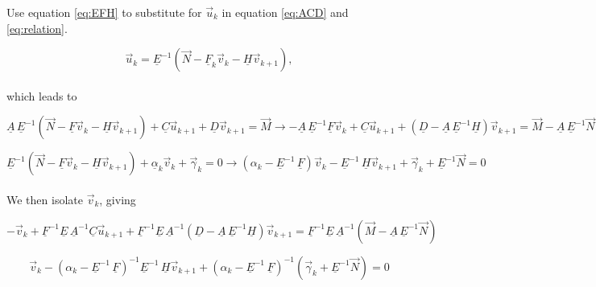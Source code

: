 \documentclass[11pt]{amsart}
\begin{document}
Use equation \ref{eq:EFH} to substitute for $\vec{u}_{k}$ in equation \ref{eq:ACD} and \ref{eq:relation}.

\begin{equation} \label{eq:IIIa}
\vec{u}_{k}  = \underline{E}^{-1}  \left( \vec{N} - \underline{F}_{k}  \vec{v}_{k}  - \underline{H} \vec{v}_{k+1} \right),
\end{equation}
\\
which leads to

\begin{equation} \label{eq:IIIb}
\underline{A} \, \underline{E}^{-1} \left(  \vec{N} - \underline{F} \vec{v}_{k} - \underline{H} \vec{v}_{k+1}  \right)  +  \underline{C} \vec{u}_{k+1}  +  \underline{D} \vec{v}_{k+1}  =  \vec{M}   \longrightarrow   - \underline{A} \, \underline{E}^{-1} \underline{F} \vec{v}_{k}  +  \underline{C} \vec{u}_{k+1}  +  \left( \underline{D} - \underline{A} \, \underline{E}^{-1} \underline{H} \right) \vec{v}_{k+1}  =  \vec{M}  -  \underline{A} \, \underline{E}^{-1} \vec{N}
\end{equation}

\begin{equation} \label{eq:IIIc}
\underline{E}^{-1} \left(  \vec{N} - \underline{F} \vec{v}_{k} - \underline{H} \vec{v}_{k+1}  \right)  +  \underline{\alpha}_{k} \vec{v}_{k}  +  \vec{\gamma}_{k}  =  0     \longrightarrow  \left(   \alpha_{k}  -  \underline{E}^{-1} \, \underline{F}  \right) \vec{v}_{k}  -  \underline{E}^{-1} \, \underline{H} \vec{v}_{k+1}  +  \vec{\gamma}_{k}  +  \underline{E}^{-1} \vec{N}  =  0
\end{equation} 
\\

We then isolate $\vec{v}_{k}$, giving

\begin{equation} \label{eq:IIId}
-  \vec{v}_{k}  +  \underline{F}^{-1} \underline{E} \, \underline{A}^{-1} \underline{C} \vec{u}_{k+1}  +  \underline{F}^{-1} \underline{E} \, \underline{A}^{-1} \left( \underline{D} - \underline{A} \, \underline{E}^{-1} \underline{H} \right) \vec{v}_{k+1}  =  \underline{F}^{-1} \underline{E} \, \underline{A}^{-1}  \left(\vec{M}  -  \underline{A} \, \underline{E}^{-1} \vec{N}  \right)
\end{equation}

\begin{equation} \label{eq:IIIe}
\vec{v}_{k}  -  \left(   \alpha_{k}  -  \underline{E}^{-1} \, \underline{F}  \right)^{-1} \underline{E}^{-1} \, \underline{H} \vec{v}_{k+1}  +  \left(   \alpha_{k}  -  \underline{E}^{-1} \, \underline{F}  \right)^{-1}  \left(\vec{\gamma}_{k}  +  \underline{E}^{-1} \vec{N} \right) =  0
\end{equation} 
\\
\end{document}

